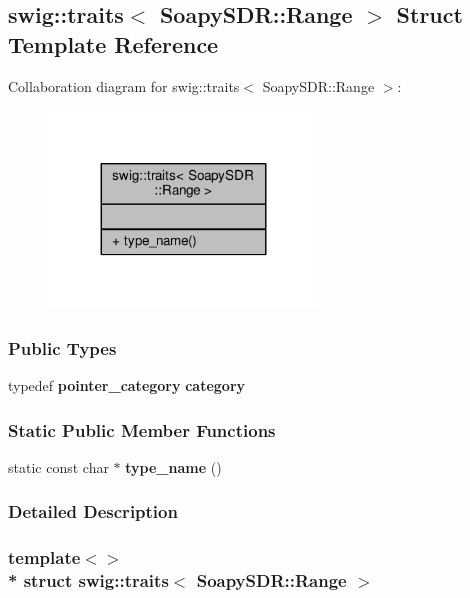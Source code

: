 \subsection{swig\+:\+:traits$<$ Soapy\+S\+DR\+:\+:Range $>$ Struct Template Reference}
\label{structswig_1_1traits_3_01SoapySDR_1_1Range_01_4}


Collaboration diagram for swig\+:\+:traits$<$ Soapy\+S\+DR\+:\+:Range $>$\+:
\nopagebreak
\begin{figure}[H]
\begin{center}
\leavevmode
\includegraphics[width=203pt]{d0/d5c/structswig_1_1traits_3_01SoapySDR_1_1Range_01_4__coll__graph}
\end{center}
\end{figure}
\subsubsection*{Public Types}
\begin{DoxyCompactItemize}
\item 
typedef {\bf pointer\+\_\+category} {\bf category}
\end{DoxyCompactItemize}
\subsubsection*{Static Public Member Functions}
\begin{DoxyCompactItemize}
\item 
static const char $\ast$ {\bf type\+\_\+name} ()
\end{DoxyCompactItemize}


\subsubsection{Detailed Description}
\subsubsection*{template$<$$>$\\*
struct swig\+::traits$<$ Soapy\+S\+D\+R\+::\+Range $>$}



